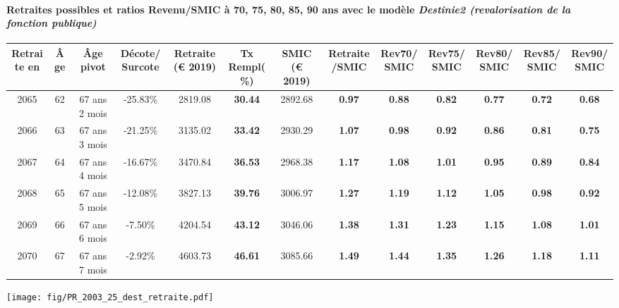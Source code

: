 \paragraph{Retraites possibles et ratios Revenu/SMIC à 70, 75, 80, 85, 90 ans avec le modèle \emph{Destinie2 (revalorisation de la fonction publique)}}  
 
{ \scriptsize \begin{center} 
\begin{tabular}[htb]{|c|c||c|c||c|c||c||c|c|c|c|c|c|} 
\hline 
 Retraite en &  Âge &  Âge pivot &  Décote/Surcote &  Retraite (\euro{} 2019) &  Tx Rempl(\%) &  SMIC (\euro{} 2019) &  Retraite/SMIC &  Rev70/SMIC &  Rev75/SMIC &  Rev80/SMIC &  Rev85/SMIC &  Rev90/SMIC \\ 
\hline \hline 
 2065 &  62 &  67 ans 2 mois &  -25.83\% &  2819.08 &  {\bf 30.44} &  2892.68 &  {\bf {\color{red} 0.97}} &  {\bf {\color{red} 0.88}} &  {\bf {\color{red} 0.82}} &  {\bf {\color{red} 0.77}} &  {\bf {\color{red} 0.72}} &  {\bf {\color{red} 0.68}} \\ 
\hline 
 2066 &  63 &  67 ans 3 mois &  -21.25\% &  3135.02 &  {\bf 33.42} &  2930.29 &  {\bf 1.07} &  {\bf {\color{red} 0.98}} &  {\bf {\color{red} 0.92}} &  {\bf {\color{red} 0.86}} &  {\bf {\color{red} 0.81}} &  {\bf {\color{red} 0.75}} \\ 
\hline 
 2067 &  64 &  67 ans 4 mois &  -16.67\% &  3470.84 &  {\bf 36.53} &  2968.38 &  {\bf 1.17} &  {\bf 1.08} &  {\bf 1.01} &  {\bf {\color{red} 0.95}} &  {\bf {\color{red} 0.89}} &  {\bf {\color{red} 0.84}} \\ 
\hline 
 2068 &  65 &  67 ans 5 mois &  -12.08\% &  3827.13 &  {\bf 39.76} &  3006.97 &  {\bf 1.27} &  {\bf 1.19} &  {\bf 1.12} &  {\bf 1.05} &  {\bf {\color{red} 0.98}} &  {\bf {\color{red} 0.92}} \\ 
\hline 
 2069 &  66 &  67 ans 6 mois &  -7.50\% &  4204.54 &  {\bf 43.12} &  3046.06 &  {\bf 1.38} &  {\bf 1.31} &  {\bf 1.23} &  {\bf 1.15} &  {\bf 1.08} &  {\bf 1.01} \\ 
\hline 
 2070 &  67 &  67 ans 7 mois &  -2.92\% &  4603.73 &  {\bf 46.61} &  3085.66 &  {\bf 1.49} &  {\bf 1.44} &  {\bf 1.35} &  {\bf 1.26} &  {\bf 1.18} &  {\bf 1.11} \\ 
\hline 
\hline 
\end{tabular} 
\end{center} } 

 \begin{center}\texttt{[image: fig/PR\_2003\_25\_dest\_retraite.pdf]}\end{center} \label{fig/PR_2003_25_dest_retraite.pdf} 

